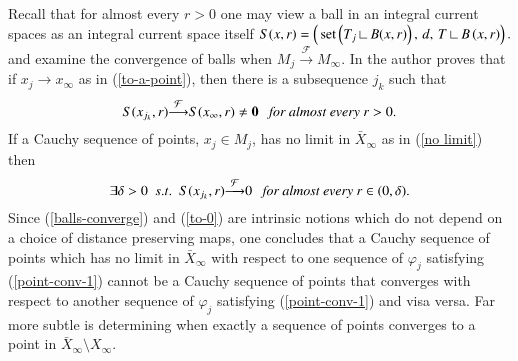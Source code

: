 \documentclass[12pt]{amsart}
\begin{document}
Recall that for almost every $r>0$ one may view a ball in an integral current
spaces as an integral current space itself
$
S(x,r)=\left(\,{{\rm{set}}}\left(T_j{\:\mbox{\rule{0.1ex}{1.2ex}\rule{1.1ex}{0.1ex}}\:} B(x,r)\right), \, d,\, T{\:\mbox{\rule{0.1ex}{1.2ex}\rule{1.1ex}{0.1ex}}\:} B\left(x,r\right)\right).
$
and examine the convergence of balls when $M_j {\stackrel {\mathcal{F}}{\longrightarrow} } M_\infty$.
In \cite{Sormani-AA} the author proves that if $x_j \to x_\infty$ as in (\ref{to-a-point}), then there is a subsequence $j_k$
such that 
\begin{equation}  \label{balls-converge}
S(x_{j_k}, r) {\stackrel {\mathcal{F}}{\longrightarrow} } S(x_\infty, r) \neq {\bf{0}} \,\,\,\textrm{ {\em for almost every} } r>0.
\end{equation}
If a Cauchy sequence of points, $x_j\in M_j$, has no limit in $\bar{X}_\infty$
as in (\ref{no limit}) then 
\begin{equation}  \label{to-0}
\exists \delta>0 \,\,\,s.t.\,\,\,S(x_{j_k}, r) {\stackrel {\mathcal{F}}{\longrightarrow} } 0 \,\,\,\textrm{ {\em for almost every }} r\in (0,\delta).
\end{equation}
Since (\ref{balls-converge}) and (\ref{to-0}) are intrinsic notions which do not
depend on a choice of distance preserving maps, one concludes that a Cauchy
sequence of points which has no limit in $\bar{X}_\infty$ with respect to one 
sequence of $\varphi_j$ satisfying (\ref{point-conv-1})
cannot be a Cauchy sequence of
points that converges with respect to another sequence
of $\varphi_j$ satisfying (\ref{point-conv-1})
and visa versa. Far more subtle is determining
when exactly a sequence of points converges to a point in 
$\bar{X}_\infty\setminus X_\infty$.
\end{document}
